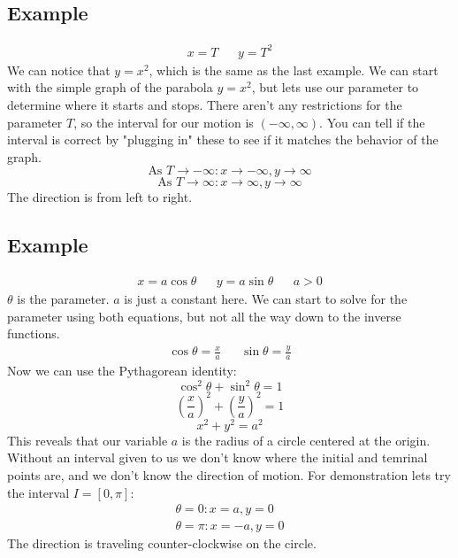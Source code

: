 \documentclass{report}
\begin{document}
    \subsection{Example}
        \begin{align*}
            x = T &&
            y = T^2
        \end{align*}
        We can notice that \(y = x^2\), which is the same as the last example. 
        We can start with the simple graph of the parabola \(y = x^2\), but lets use our parameter to determine where it starts and stops.
        There aren't any restrictions for the parameter \(T\), so the interval for our motion is \((- \infty, \infty)\).
        You can tell if the interval is correct by "plugging in" these to see if it matches the behavior of the graph.
        \[\text{As } T \to - \infty: x \to - \infty, y \to \infty\]
        \[\text{As } T \to \infty: x \to \infty, y \to \infty\]
        The direction is from left to right.
        
    \subsection{Example}
        \begin{align*}
            x = a \cos \theta &&
            y = a \sin \theta &&
            a > 0
        \end{align*}
        \(\theta\) is the parameter.
        \(a\) is just a constant here.
        We can start to solve for the parameter using both equations, but not all the way down to the inverse functions.
        \begin{align*}
            \cos \theta = \frac{x}{a} &&
            \sin \theta = \frac{y}{a}
        \end{align*}
        Now we can use the Pythagorean identity:
        \[\cos^2 \theta + \sin^2 \theta = 1\]
        \[\left( \frac{x}{a} \right)^2 + \left(\frac{y}{a}\right)^2 = 1\]
        \[x^2 + y^2 = a^2\]
        This reveals that our variable \(a\) is the radius of a circle centered at the origin.
        Without an interval given to us we don't know where the initial and temrinal points are, and we don't know the direction of motion.
        For demonstration lets try the interval \(I = [0, \pi]\):
        \begin{align*}
            \theta = 0 : x = a, y = 0 \\
            \theta = \pi : x = -a, y = 0
        \end{align*}
        The direction is traveling counter-clockwise on the circle.
        
\end{document}
